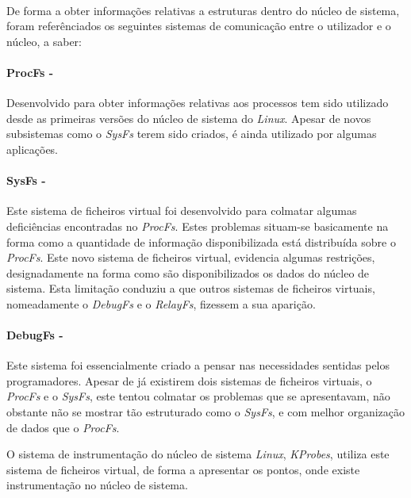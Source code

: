 \paragraph*{}
De forma a obter informações relativas a estruturas dentro do núcleo de sistema, foram referênciados os seguintes sistemas de comunicação entre o utilizador e o núcleo, a saber:

\paragraph*{ProcFs - }\label{cap:ProcFs_overview}

Desenvolvido para obter informações relativas aos processos tem sido utilizado desde as primeiras versões do núcleo de sistema do \textit{Linux}.
Apesar de novos subsistemas como o \textit{SysFs} terem sido criados, é ainda utilizado por algumas aplicações.

\paragraph*{SysFs - }\label{cap:SysFs_overview}

Este sistema de ficheiros virtual foi desenvolvido para colmatar algumas deficiências encontradas no \textit{ProcFs}.
Estes problemas situam-se basicamente na forma como a quantidade de informação disponibilizada está distribuída sobre o \textit{ProcFs}.
Este novo sistema de ficheiros virtual, evidencia algumas restrições, designadamente na forma como são disponibilizados os dados do núcleo de sistema.
Esta limitação conduziu a que outros sistemas de ficheiros virtuais, nomeadamente o \textit{DebugFs} e o \textit{RelayFs}, fizessem a sua aparição.

\paragraph*{DebugFs - }\label{cap:DebugFs_overview}

Este sistema foi essencialmente criado a pensar nas necessidades sentidas pelos programadores.
Apesar de já existirem dois sistemas de ficheiros virtuais, o \textit{ProcFs} e o \textit{SysFs}, este tentou colmatar os problemas que se apresentavam, não obstante não se mostrar tão estruturado como o \textit{SysFs}, e com melhor organização de dados que o \textit{ProcFs}.

O sistema de instrumentação do núcleo de sistema \textit{Linux}, \textit{KProbes}, utiliza este sistema de ficheiros virtual, de forma a apresentar os pontos, onde existe instrumentação no núcleo de sistema.

